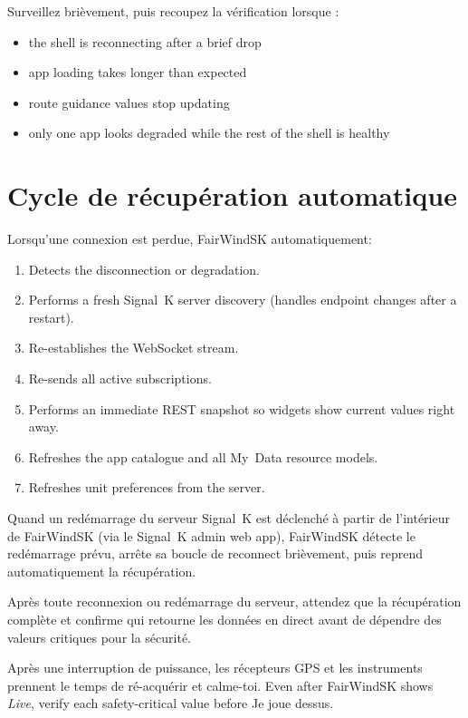 Surveillez brièvement, puis recoupez la vérification lorsque :

\begin{itemize}
  \item the shell is reconnecting after a brief drop
  \item app loading takes longer than expected
  \item route guidance values stop updating
  \item only one app looks degraded while the rest of the shell is healthy
\end{itemize}

\section{Cycle de récupération automatique}

Lorsqu'une connexion est perdue, FairWindSK automatiquement:

\begin{enumerate}
  \item Detects the disconnection or degradation.
  \item Performs a fresh Signal~K server discovery (handles endpoint changes after a restart).
  \item Re-establishes the WebSocket stream.
  \item Re-sends all active subscriptions.
  \item Performs an immediate REST snapshot so widgets show current values right away.
  \item Refreshes the app catalogue and all My~Data resource models.
  \item Refreshes unit preferences from the server.
\end{enumerate}

Quand un redémarrage du serveur Signal~K est déclenché à partir de l'intérieur de FairWindSK (via le Signal~K
admin web app), FairWindSK détecte le redémarrage prévu, arrête sa boucle de reconnect
brièvement, puis reprend automatiquement la récupération.

Après toute reconnexion ou redémarrage du serveur, attendez que la récupération complète et confirme
qui retourne les données en direct avant de dépendre des valeurs critiques pour la sécurité.

\begin{warningbox}
Après une interruption de puissance, les récepteurs GPS et les instruments prennent le temps de ré-acquérir et
calme-toi.
Even after FairWindSK shows \textit{Live}, verify each safety-critical value before
Je joue dessus.
\end{warningbox}

